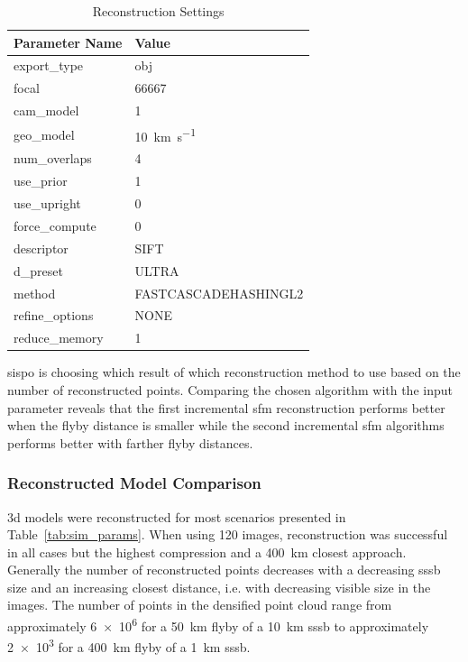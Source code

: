 \begin{table}[htb]
    \centering
    \caption{Reconstruction Settings}
    \label{tab:comp_settings}
    \begin{tabular}{l|l}
        \textbf{Parameter Name} & \textbf{Value} \\ \hline
        export\_type       & obj   \\
        focal & 66667 \\
        cam\_model & \SI{1}{}     \\
        geo\_model & \SI{10}{\kilo\meter\per\second} \\
        num\_overlaps  & \SI{4}{} \\
        use\_prior & \SI{1}{} \\
        use\_upright & \SI{0}{} \\
        force\_compute & \SI{0}{} \\
        descriptor & SIFT \\
        d\_preset & ULTRA \\
        method & FASTCASCADEHASHINGL2 \\
        refine\_options & NONE \\
        reduce\_memory & 1
    \end{tabular}
\end{table}

\gls{sispo} is choosing which result of which reconstruction method to use based on the number of reconstructed points. Comparing the chosen algorithm with the input parameter reveals that the first incremental \gls{sfm} reconstruction performs better when the flyby distance is smaller while the second incremental \gls{sfm} algorithms performs better with farther flyby distances.

\subsubsection{Reconstructed Model Comparison}
\Gls{3d} models were reconstructed for most scenarios presented in Table~\ref{tab:sim_params}. When using \SI{120}{} images, reconstruction was successful in all cases but the highest compression and a \SI{400}{\kilo\meter} closest approach.
Generally the number of reconstructed points decreases with a decreasing \gls{sssb} size and an increasing closest distance, i.e. with decreasing visible size in the images.
The number of points in the densified point cloud range from approximately \SI{6e6}{} for a \SI{50}{\kilo\meter} flyby of a \SI{10}{\kilo\meter} \gls{sssb} to approximately \SI{2e3}{} for a \SI{400}{\kilo\meter} flyby of a \SI{1}{\kilo\meter} \gls{sssb}.

